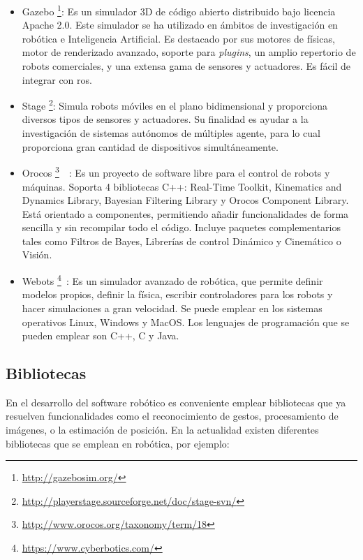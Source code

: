 \begin{itemize}
\item Gazebo \footnote{\url{http://gazebosim.org/}}: Es un simulador 3D de código abierto distribuido bajo licencia Apache 2.0. Este simulador se ha utilizado en ámbitos de investigación en robótica e Inteligencia Artificial. Es destacado por sus motores de físicas, motor de renderizado avanzado, soporte para \textit{plugins}, un amplio repertorio de robots comerciales, y una extensa gama de sensores y actuadores. Es fácil de integrar con \acrshort{ros}.
\item Stage \footnote{\url{http://playerstage.sourceforge.net/doc/stage-svn/}}: Simula robots móviles en el plano bidimensional y proporciona diversos tipos de sensores y actuadores. Su finalidad es ayudar a la investigación de sistemas autónomos de múltiples agente, para lo cual proporciona gran cantidad de dispositivos simultáneamente.
\item Orocos \footnote{\url{http://www.orocos.org/taxonomy/term/18}}~\cite{orocos}~\cite{orocos1}: Es un proyecto de software libre para el control de robots y máquinas. Soporta 4 bibliotecas C++: Real-Time Toolkit, Kinematics and Dynamics Library,  Bayesian Filtering Library y  Orocos Component Library. Está orientado a componentes, permitiendo añadir funcionalidades de forma sencilla y sin recompilar todo el código.  Incluye paquetes complementarios tales como Filtros de Bayes, Librerías de control Dinámico y Cinemático o Visión. 
\item Webots \footnote{\url{https://www.cyberbotics.com/}}~\cite{webots}: Es un simulador avanzado de robótica, que permite definir modelos propios, definir la física, escribir controladores para los robots y hacer simulaciones a gran velocidad. Se puede emplear en los sistemas operativos Linux, Windows y MacOS. Los lenguajes de programación que se pueden emplear son  C++, C y Java.
\end{itemize}

\subsection{Bibliotecas}
En el desarrollo del software robótico es conveniente emplear bibliotecas que ya resuelven funcionalidades como el reconocimiento de gestos, procesamiento de imágenes, o la estimación de posición. En la actualidad existen diferentes bibliotecas que se emplean en robótica, por ejemplo:

